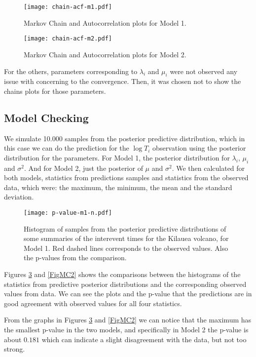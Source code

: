 \documentclass{asaproc}
\begin{document}
\begin{figure}[H]
\centering
\texttt{[image: chain-acf-m1.pdf]}
\caption{Markov Chain and Autocorrelation plots for Model 1.}
\label{FigMCACF1}
\end{figure}

\begin{figure}[H]
\centering
\texttt{[image: chain-acf-m2.pdf]}
\caption{Markov Chain and Autocorrelation plots for Model 2.}
\label{FigMCACF2}
\end{figure}

For the others, parameters corresponding to $\lambda_i$ and $\mu_i$ were not observed any issue with concerning to the convergence. Then, it was chosen not to show the chains plots for those parameters.

\subsection{Model Checking}

We simulate 10.000 samples from the posterior predictive distribution, which in this case we can do the prediction for the $\log T_i$ observation using the posterior distribution for the parameters. For Model 1, the posterior distribution for $\lambda_i$, $\mu_i$ and $\sigma^2$. And for Model 2, just the posterior of $\mu$ and $\sigma^2$. We then calculated for both models, statistics from predictions samples and statistics from the observed data, which were: the maximum, the minimum, the mean and the standard deviation.
\begin{figure}[H]
\centering
\texttt{[image: p-value-m1-n.pdf]}
\caption{Histogram of samples from the posterior predictive distributions of some summaries of the interevent times for the Kilauea volcano, for Model 1. Red dashed lines corresponds to the observed values. Also the p-values from the comparison.}
\label{FigMC1}
\end{figure}


Figures \ref{FigMC1} and \ref{FigMC2} shows the comparisons between the histograms of the statistics from predictive posterior distributions and the corresponding observed values from data. We can see the plots and the p-value that the predictions are in good agreement with observed values for all four statistics.

From the graphs in Figures \ref{FigMC1} and \ref{FigMC2} we can notice that the maximum has the smallest p-value in the two models, and specifically in Model 2 the p-value is about $0.181$ which can indicate a slight disagreement with the data, but not too strong.
\end{document}
